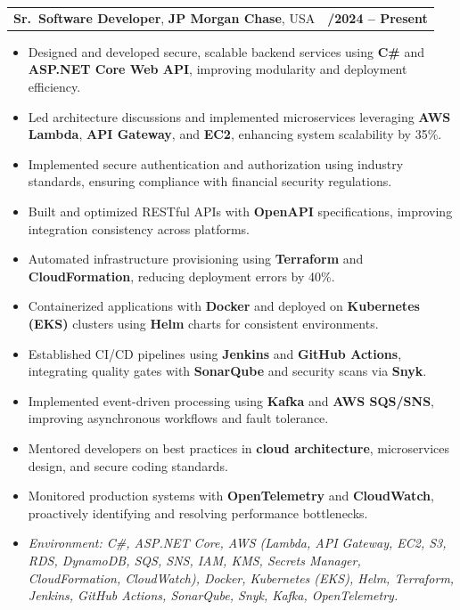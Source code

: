 \documentclass[letterpaper,11pt]{article}
\makeatletter
\newcommand{\resumeItem}[1]{
  \item\footnotesize{
    {#1 \vspace{-2pt}}
  }
}
\newcommand{\resumeSubheading}[4]{
  \vspace{-2pt}\item
    \begin{tabular*}{1.0\textwidth}[t]{l@{\extracolsep{\fill}}r}
      \textbf{\fontsize{10pt}{14pt}\selectfont #3}, \textbf{\fontsize{10pt}{14pt}\selectfont #1}, \fontsize{10pt}{14pt}\selectfont #4 & \textbf{\fontsize{10pt}{14pt}\selectfont #2} \\
    \end{tabular*}\vspace{-7pt}
}
\newcommand{\resumeItemListStart}{\begin{itemize}[leftmargin=*]}
\newcommand{\resumeItemListEnd}{\end{itemize}\vspace{-5pt}}
\makeatother
\begin{document}
\resumeSubheading
{JP Morgan Chase}{09/2024 -- Present}
{Sr.\ Software Developer}{USA}
\resumeItemListStart
  \resumeItem{Designed and developed secure, scalable backend services using \textbf{C\#} and \textbf{ASP.NET Core Web API}, improving modularity and deployment efficiency.}
  \resumeItem{Led architecture discussions and implemented microservices leveraging \textbf{AWS Lambda}, \textbf{API Gateway}, and \textbf{EC2}, enhancing system scalability by 35\%.}
  \resumeItem{Implemented secure authentication and authorization using industry standards, ensuring compliance with financial security regulations.}
  \resumeItem{Built and optimized RESTful APIs with \textbf{OpenAPI} specifications, improving integration consistency across platforms.}
  \resumeItem{Automated infrastructure provisioning using \textbf{Terraform} and \textbf{CloudFormation}, reducing deployment errors by 40\%.}
  \resumeItem{Containerized applications with \textbf{Docker} and deployed on \textbf{Kubernetes (EKS)} clusters using \textbf{Helm} charts for consistent environments.}
  \resumeItem{Established CI/CD pipelines using \textbf{Jenkins} and \textbf{GitHub Actions}, integrating quality gates with \textbf{SonarQube} and security scans via \textbf{Snyk}.}
  \resumeItem{Implemented event-driven processing using \textbf{Kafka} and \textbf{AWS SQS/SNS}, improving asynchronous workflows and fault tolerance.}
  \resumeItem{Mentored developers on best practices in \textbf{cloud architecture}, microservices design, and secure coding standards.}
  \resumeItem{Monitored production systems with \textbf{OpenTelemetry} and \textbf{CloudWatch}, proactively identifying and resolving performance bottlenecks.}
  \resumeItem{\textit{Environment: C\#, ASP.NET Core, AWS (Lambda, API Gateway, EC2, S3, RDS, DynamoDB, SQS, SNS, IAM, KMS, Secrets Manager, CloudFormation, CloudWatch), Docker, Kubernetes (EKS), Helm, Terraform, Jenkins, GitHub Actions, SonarQube, Snyk, Kafka, OpenTelemetry.}}
\resumeItemListEnd
\end{document}
